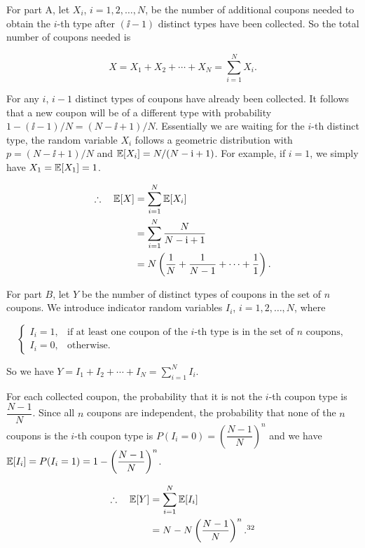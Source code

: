 \begin{solution}
For part A, let $X_i$, $i=1,2,\ldots,N$, be the number of additional coupons needed
to obtain the $i$-th type after $(\ii-1)$ distinct types have been collected. So the total
number of coupons needed is

\[
X=X_1+X_2+\cdots+X_N=\sum_{i=1}^{N}X_i.
\]

For any $i$, $i-1$ distinct types of coupons have already been collected. It follows that a
new coupon will be of a different type with probability $1-(\ii-1)/N=(N-\ii+1)/N$.
Essentially we are waiting for the $i$-th distinct type, the random variable $X_i$ follows a
geometric distribution with $p=(N-\ii+1)/N$ and $\mathbb{E}[X_i]=N/(N-\mathrm{i}+1)$. For example, if
$i=1$, we simply have $X_1=\mathbb{E}[X_1]=1$.

\[
\begin{aligned}
\therefore\quad \mathbb{E}[X]&=\sum_{i=1}^{N}\mathbb{E}[X_i]\\
&=\sum_{i=1}^{N}\frac{N}{N-\mathrm{i}+1}\\
&=N\left(\frac{1}{N}+\frac{1}{N-1}+\cdots+\frac{1}{1}\right).
\end{aligned}
\]


For part $B$, let $Y$ be the number of distinct types of coupons in the set of $n$ coupons.
We introduce indicator random variables $I_i$, $i=1,2,\ldots,N$, where

\[
\begin{cases}
I_i=1, & \text{if at least one coupon of the $i$-th type is in the set of $n$ coupons},\\
I_i=0, & \text{otherwise}.
\end{cases}
\]

So we have $Y=I_1+I_2+\cdots+I_N=\displaystyle\sum_{i=1}^{N}I_i$.

For each collected coupon, the probability that it is not the $i$-th coupon type is
$\dfrac{N-1}{N}$. Since all $n$ coupons are independent, the probability that none of the
$n$ coupons is the $i$-th coupon type is
$P(I_i=0)=\left(\dfrac{N-1}{N}\right)^n$ and we have
$\mathbb{E}[I_i]=P(I_i=1)=1-\left(\dfrac{N-1}{N}\right)^n$.

\[
\begin{aligned}
\therefore\quad \E[Y]&=\sum_{i=1}^{N}\E[I_i]\\
&=N-N\left(\frac{N-1}{N}\right)^n.\footnotemark[32]
\end{aligned}
\]
\end{solution}

